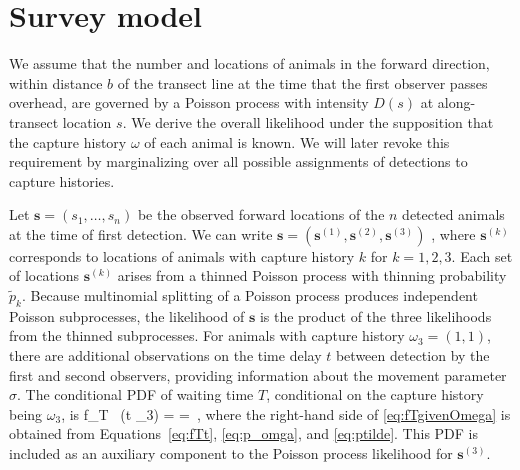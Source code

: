 \documentclass[useAMS, usenatbib, referee]{biom}\usepackage[]{graphicx}\usepackage[]{color}
\begin{document}
\section{Survey model}


We assume that the number and locations of animals in the forward direction, within distance $b$ of the transect line at the time that the first observer passes overhead, are governed by a Poisson process with intensity $D(s)$ at along-transect location $s$. We derive the overall likelihood under the supposition that the capture history $\omega$ of each animal is known. We will later revoke this requirement by marginalizing over all possible assignments of detections to capture histories.


Let $\bm{s}=(s_1, \ldots, s_n)$ be the observed forward locations of the $n$ detected animals at the time of first detection. We can write $\bm{s}=\left(\bm{s}^{(1)}, \bm{s}^{(2)}, \bm{s}^{(3)}\right)$ , where $\bm{s}^{(k)}$ corresponds to locations of animals with capture history $k$ for $k=1, 2, 3$. Each set of locations $\bm{s}^{(k)}$ arises from a thinned Poisson process with thinning probability $ \tilde{p}_{k}$. Because multinomial splitting of a Poisson process produces independent Poisson subprocesses, the likelihood of $\bm{s}$ is the product of the three likelihoods from the thinned subprocesses. For animals with capture history $\omega_3=(1,1)$, there are additional observations on the time delay $t$ between detection by the first and second observers, providing information about the movement parameter $\sigma$. The conditional PDF of waiting time $T$, conditional on the capture history being $\omega_3$, is
\be
f_{T \mid \,\omega} (t \mid \omega_3) =  =  \,,
\label{eq:fTgivenOmega}
\ee
where the right-hand side of \eqref{eq:fTgivenOmega} is obtained from Equations~\eqref{eq:fTt}, \eqref{eq:p_omga}, and \eqref{eq:ptilde}. This PDF is included as an auxiliary component to the Poisson process likelihood for $\bm{s}^{(3)}$.
\end{document}
